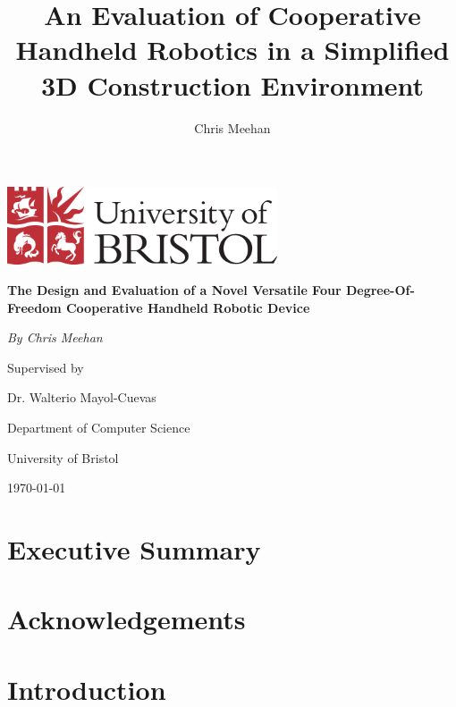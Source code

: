 \documentclass[11pt]{article}
\title{An Evaluation of Cooperative Handheld Robotics in a Simplified 3D Construction Environment}
\author{Chris Meehan}
\begin{document}
\begin{titlepage}
	\centering
	
	\includegraphics[width=0.6\textwidth]{bristol.png}
	\vspace{2cm}

	{\huge\bfseries The Design and Evaluation of a Novel Versatile Four Degree-Of-Freedom Cooperative Handheld Robotic Device\par}
	\vspace{1.5cm}

	{\Large\itshape By Chris Meehan\par}
	
	Supervised by\par
	Dr. Walterio Mayol-Cuevas
	
	\vspace{1.5cm}
	
	Department of Computer Science\par
	University of Bristol

	\vfill

	{\large \today\par}
\end{titlepage}

\renewcommand{\thepage}{\roman{page}}%
\section*{Executive Summary}
\pagebreak

\section*{Acknowledgements}
\pagebreak

\renewcommand{\thepage}{\arabic{page}}%

\setcounter{page}{1}%

\tableofcontents
\pagebreak



\section{Introduction}
\end{document}
